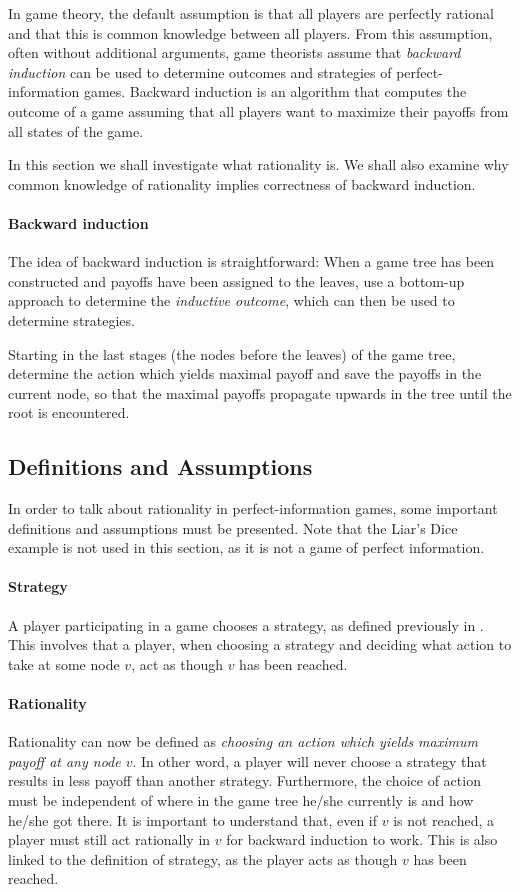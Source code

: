 In game theory, the default assumption is that all players are perfectly rational and that this is common knowledge between all players. From this assumption, often without additional arguments, game theorists assume that \emph{backward induction} can be used to determine outcomes and strategies of perfect-information games. Backward induction is an algorithm that computes the outcome of a game assuming that all players want to maximize their payoffs from all states of the game.

In this section we shall investigate what rationality is. We shall also examine why common knowledge of rationality implies correctness of backward induction.

\paragraph*{Backward induction}
The idea of backward induction is straightforward: When a game tree has been constructed and payoffs have been assigned to the leaves, use a bottom-up approach to determine the \emph{inductive outcome}, which can then be used to determine strategies. 

Starting in the last stages (the nodes before the leaves) of the game tree, determine the action which yields maximal payoff and save the payoffs in the current node, so that the maximal payoffs propagate upwards in the tree until the root is encountered.

\subsection{Definitions and Assumptions}
In order to talk about rationality in perfect-information games, some important definitions and assumptions must be presented. Note that the Liar's Dice example is not used in this section, as it is not a game of perfect information.

\paragraph*{Strategy} A player participating in a game chooses a strategy, as defined previously in . This involves that a player, when choosing a strategy and deciding what action to take at some node $v$, act as though $v$ has been reached.

\paragraph*{Rationality} Rationality can now be defined as \textit{choosing an action which yields maximum payoff at any node $v$}. In other word, a player will never choose a strategy that results in less payoff than another strategy. Furthermore, {\color{red}the choice of action must be independent of where in the game tree he/she currently is and how he/she got there}. It is important to understand that, even if $v$ is not reached, a player must still act rationally in $v$ for backward induction to work. This is also linked to the definition of strategy, as the player acts as though $v$ has been reached.

